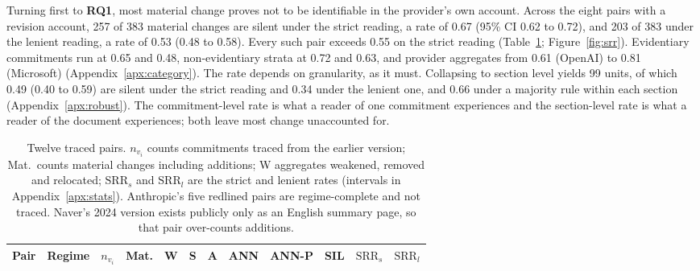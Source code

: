\documentclass{article}
\newcommand{\srr}{\mathrm{SRR}}
\begin{document}
Turning first to \textbf{RQ1}, most material change proves not to be identifiable in the provider's own account. Across the eight pairs with a revision account, 257 of 383 material changes are silent under the strict reading, a rate of 0.67 (95\% CI 0.62 to 0.72), and 203 of 383 under the lenient reading, a rate of 0.53 (0.48 to 0.58). Every such pair exceeds 0.55 on the strict reading (Table~\ref{tab:pairs}; Figure~\ref{fig:srr}). Evidentiary commitments run at 0.65 and 0.48, non-evidentiary strata at 0.72 and 0.63, and provider aggregates from 0.61 (OpenAI) to 0.81 (Microsoft) (Appendix~\ref{apx:category}). The rate depends on granularity, as it must. Collapsing to section level yields 99 units, of which 0.49 (0.40 to 0.59) are silent under the strict reading and 0.34 under the lenient one, and 0.66 under a majority rule within each section (Appendix~\ref{apx:robust}). The commitment-level rate is what a reader of one commitment experiences and the section-level rate is what a reader of the document experiences; both leave most change unaccounted for.

\begin{table}[t]
\centering\scriptsize\setlength{\tabcolsep}{3pt}
\caption{Twelve traced pairs. $n_{v_i}$ counts commitments traced from the earlier version; Mat.\ counts material changes including additions; W aggregates weakened, removed and relocated; $\srr_s$ and $\srr_l$ are the strict and lenient rates (intervals in Appendix~\ref{apx:stats}). Anthropic's five redlined pairs are regime-complete and not traced. Naver's 2024 version exists publicly only as an English summary page, so that pair over-counts additions.}
\label{tab:pairs}
\begin{tabular}{llrrrrrrrrrr}
\toprule
Pair & Regime & $n_{v_i}$ & Mat. & W & S & A & ANN & ANN-P & SIL & $\srr_s$ & $\srr_l$ \\
\midrule

\end{tabular}
\end{table}
\end{document}
